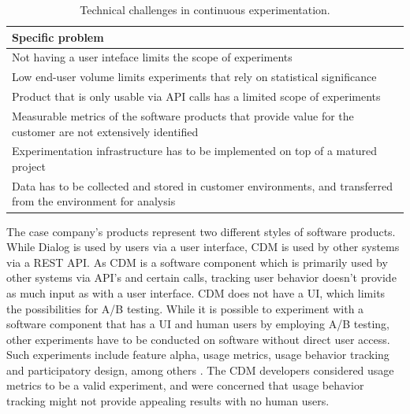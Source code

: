 \documentclass[english, grading]{tktltiki2}
\theoremstyle{definition}
\theoremstyle{remark}
\begin{document}
\begin{center}
\begin{table}[htb]
    \begin{tabular}{ | p{12cm} |}
    \hline
    \textbf{Specific problem} \\ \hline
    Not having a user inteface limits the scope of experiments \\ \hline
    Low end-user volume limits experiments that rely on statistical significance \\ \hline 
	Product that is only usable via API calls has a limited scope of experiments \\ \hline
	Measurable metrics of the software products that provide value for the customer are not extensively identified  \\ \hline
	Experimentation infrastructure has to be implemented on top of a matured project \\ \hline
	Data has to be collected and stored in customer environments, and transferred from the environment for analysis \\ 
    \hline
    \end{tabular}
    \caption{Technical challenges in continuous experimentation.}
    \end{table}
\end{center}
The case company's products represent two different styles of software products. While Dialog is used by users via a user interface, CDM is used by other systems via a REST API. As CDM is a software component which is primarily used by other systems via API's and certain calls, tracking user behavior doesn't provide as much input as with a user interface. CDM does not have a UI, which limits the possibilities for A/B testing. While it is possible to experiment with a software component that has a UI and human users by employing A/B testing, other experiments have to be conducted on software without direct user access. Such experiments include feature alpha, usage metrics, usage behavior tracking and participatory design, among others \cite{bosch2012building}. The CDM developers considered usage metrics to be a valid experiment, and were concerned that usage behavior tracking might not provide appealing results with no human users.
\end{document}
